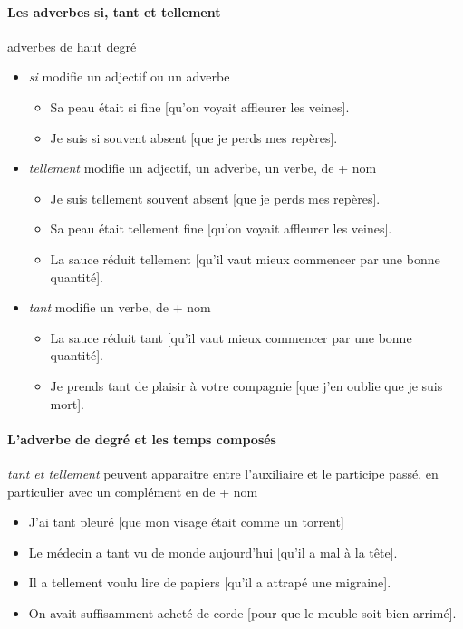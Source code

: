 \documentclass[UTF8]{report}
\begin{document}
\paragraph{Les adverbes si, tant et tellement}
adverbes de haut degré
\begin{itemize}
    \item \textit{si} modifie un adjectif ou un adverbe
    \begin{itemize}
        \item Sa peau était si fine [qu’on voyait affleurer les veines].
        \item Je suis si souvent absent [que je perds mes repères].
    \end{itemize}
    \item \textit{tellement} modifie un adjectif, un adverbe, un verbe, de + nom
    \begin{itemize}
        \item Je suis tellement souvent absent [que je perds mes repères].
        \item Sa peau était tellement fine [qu’on voyait affleurer les veines].
        \item La sauce réduit tellement [qu’il vaut mieux commencer par une bonne quantité].
    \end{itemize}
    \item \textit{tant} modifie un verbe, de + nom
    \begin{itemize}
        \item La sauce réduit tant [qu’il vaut mieux commencer par une bonne quantité].
        \item Je prends tant de plaisir à votre compagnie [que j’en oublie que je suis mort].
    \end{itemize}
\end{itemize}

\paragraph{L’adverbe de degré et les temps composés}
\textit{tant et tellement} peuvent apparaitre entre l’auxiliaire et le participe passé, en particulier avec un complément en de + nom
\begin{itemize}
    \item J’ai tant pleuré [que mon visage était comme un torrent]
    \item Le médecin a tant vu de monde aujourd’hui [qu’il a mal à la tête].
    \item Il a tellement voulu lire de papiers [qu’il a attrapé une migraine].
    \item On avait suffisamment acheté de corde [pour que le meuble soit bien arrimé].
\end{itemize}
\end{document}
